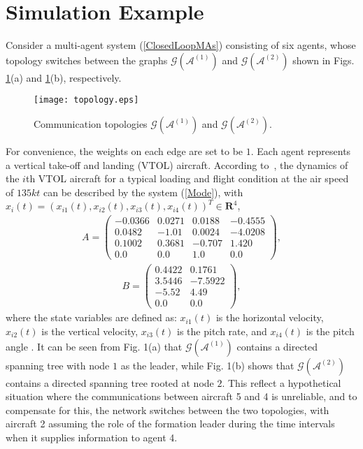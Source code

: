 \documentclass[letterpaper, 10 pt, conference]{ieeeconf}
\begin{document}
\section{Simulation Example}
Consider a multi-agent system (\ref{ClosedLoopMAs}) consisting of six
agents, whose topology switches
between the graphs
$\mathcal{G}(\mathcal{A}^{(1)})$ and $\mathcal{G}(\mathcal{A}^{(2)})$ shown
in Figs. \ref{FigureOne}(a) and \ref{FigureOne}(b), respectively.
\begin{figure}[!t]
\centering
\texttt{[image: topology.eps]}
 \caption{Communication topologies $\mathcal{G}(\mathcal{A}^{(1)})$ and $\mathcal{G}(\mathcal{A}^{(2)})$. }
\label{FigureOne}
\end{figure}
For convenience,  the weights on each edge are set to be $1$.
Each agent represents a vertical take-off and landing (VTOL) aircraft.
According to~\cite{FeiJi},
the dynamics of the $i$th VTOL aircraft for a typical loading and flight
condition at the air speed of $135kt$ can be described by the system
(\ref{Mode}), with
$x_{i}(t)=(x_{i1}(t),x_{i2}(t),x_{i3}(t),x_{i4}(t))^{T}\in \mathbf{R}^{4}$,
\begin{eqnarray*}
A=\left(\begin{array}{cccc}
-0.0366& 0.0271 &0.0188& -0.4555\\
0.0482&-1.01& 0.0024& -4.0208\\
0.1002 &0.3681& -0.707&1.420\\
0.0&0.0&1.0&0.0
\end{array}\right),
\end{eqnarray*}
\begin{eqnarray*}
B=\left(\begin{array}{cc}
0.4422&0.1761\\
3.5446&-7.5922\\
-5.52&4.49\\
0.0&0.0
\end{array}\right),
\end{eqnarray*}
where the state variables are defined as: $x_{i1}(t)$ is the horizontal velocity,
$x_{i2}(t)$ is the vertical velocity,
  $x_{i3}(t)$ is the pitch rate, and
$x_{i4}(t)$ is the
pitch angle \cite{FeiJi}. It can be seen from Fig. 1(a) that
$\mathcal{G}(\mathcal{A}^{(1)})$ contains
a directed spanning tree with node
$1$ as the leader, while Fig. 1(b) shows that
$\mathcal{G}(\mathcal{A}^{(2)})$ contains
a directed spanning tree rooted at
node $2$. This reflect a hypothetical situation where the communications
between aircraft 5 and 4 is unreliable, and to compensate for this, the
network switches between the two topologies, with aircraft 2 assuming the role
of the formation leader during the time intervals when it supplies
information to agent 4.
\end{document}
